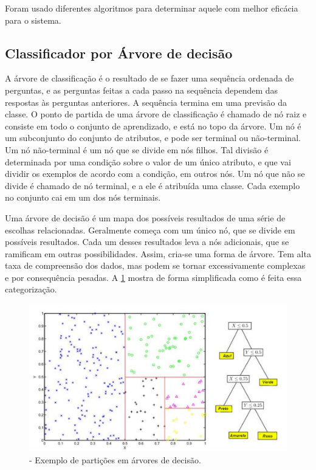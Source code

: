 Foram usado diferentes algoritmos para determinar aquele com melhor eficácia para o sistema. 
\subsection{{Classificador por Árvore de decisão}}

A árvore de classificação é o resultado de se fazer uma sequência ordenada de perguntas, e as perguntas feitas a cada passo na sequência dependem das respostas às perguntas anteriores. A sequência termina em uma previsão da classe.
O ponto de partida de uma árvore de classificação é chamado de nó raiz e consiste em todo o conjunto de aprendizado, e está no topo da árvore. Um nó é um subconjunto do conjunto de atributos, e pode ser terminal ou não-terminal. Um nó não-terminal é um nó que se divide em nós filhos. Tal divisão é determinada por uma condição sobre o valor de um único atributo, e que vai dividir os exemplos de acordo com a condição, em outros nós. Um nó que não se divide é chamado de nó terminal, e a ele é atribuída uma classe. Cada exemplo no conjunto cai em um dos nós terminais. 

Uma árvore de decisão é um mapa dos possíveis resultados de uma série de escolhas relacionadas. Geralmente começa com um único nó, que se divide em possíveis resultados. Cada um desses resultados leva a nós adicionais, que se ramificam em outras possibilidades. Assim, cria-se uma forma de árvore. Tem alta taxa de compreensão dos dados, mas podem se tornar excessivamente complexas e por consequência pesadas. A \ref{fig:arvoredecisao} mostra de forma simplificada como é feita essa categorização. 


\begin{figure}[H]
\begin{center}
\includegraphics[width=13cm]{./02_Cap2/figures/arvore_de_decisao.png}
\caption{\label{fig:arvoredecisao}- Exemplo de partições em árvores de decisão.}
\end{center}
\end{figure}

